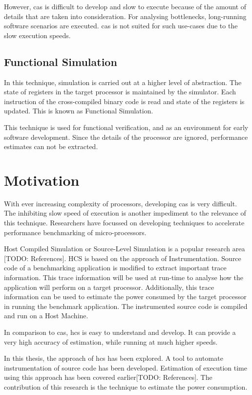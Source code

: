 However, \gls{cas} is difficult to develop and slow to execute because of the amount of details that are taken into consideration. For analysing bottlenecks, long-running software scenarios are executed. \gls{cas} is not suited for such use-cases due to the slow execution speeds.

\subsection{Functional Simulation}
In this technique, simulation is carried out at a higher level of abstraction. The state of registers in the target processor is maintained by the simulator. Each instruction of the cross-compiled binary code is read and state of the registers is updated. This is known as Functional Simulation.

This technique is used for functional verification, and as an environment for early software development. Since the details of the processor are ignored, performance estimates can not be extracted.

\section{Motivation}
With ever increasing complexity of processors, developing \gls{cas} is very difficult. The inhibiting slow speed of execution is another impediment to the relevance of this technique. Researchers have focussed on developing techniques to accelerate performance benchmarking of micro-processors. 

Host Compiled Simulation or Source-Level Simulation is a popular research area [TODO: References]. HCS is based on the approach of Instrumentation. Source code of a benchmarking application is modified to extract important trace information. This trace information will be used at run-time to analyse how the application will perform on a target processor. Additionally, this trace information can be used to estimate the power consumed by the target processor in running the benchmark application. The instrumented source code is compiled and run on a Host Machine.

In comparison to \gls{cas}, \gls{hcs} is easy to understand and develop. It can provide a very high accuracy of estimation, while running at much higher speeds.

In this thesis, the approach of \gls{hcs} has been explored. A tool to automate instrumentation of source code has been developed. Estimation of execution time using this approach has been covered earlier[TODO: References]. The contribution of this research is the technique to estimate the power consumption. 

